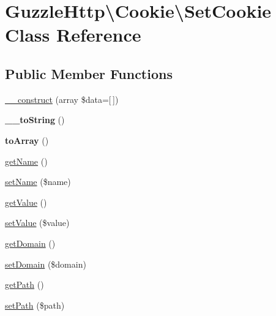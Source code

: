 \hypertarget{classGuzzleHttp_1_1Cookie_1_1SetCookie}{}\section{Guzzle\+Http\textbackslash{}Cookie\textbackslash{}Set\+Cookie Class Reference}
\label{classGuzzleHttp_1_1Cookie_1_1SetCookie}
\subsection*{Public Member Functions}
\begin{DoxyCompactItemize}
\item 
\hyperlink{classGuzzleHttp_1_1Cookie_1_1SetCookie_a743d69456fd1f19cb52e38d0b8dbfb75}{\+\_\+\+\_\+construct} (array \$data=\mbox{[}$\,$\mbox{]})
\item 
\mbox{\label{classGuzzleHttp_1_1Cookie_1_1SetCookie_a0b30c05bb7043c170f1d2a229b007053}} 
{\bfseries \+\_\+\+\_\+to\+String} ()
\item 
\mbox{\label{classGuzzleHttp_1_1Cookie_1_1SetCookie_ad47fa84e115b623fdba473dc4704dcd8}} 
{\bfseries to\+Array} ()
\item 
\hyperlink{classGuzzleHttp_1_1Cookie_1_1SetCookie_a573b2821257add2459ac921f74d05931}{get\+Name} ()
\item 
\hyperlink{classGuzzleHttp_1_1Cookie_1_1SetCookie_a8921080d5e7ec99f8a6aaad461543f47}{set\+Name} (\$name)
\item 
\hyperlink{classGuzzleHttp_1_1Cookie_1_1SetCookie_aabb8fb580eb7bf635830e850986ae47d}{get\+Value} ()
\item 
\hyperlink{classGuzzleHttp_1_1Cookie_1_1SetCookie_a9ffacb8b0c83065f3f1ecd86ab975b7e}{set\+Value} (\$value)
\item 
\hyperlink{classGuzzleHttp_1_1Cookie_1_1SetCookie_a00d077c7eb6f6c5f62f28b3065250280}{get\+Domain} ()
\item 
\hyperlink{classGuzzleHttp_1_1Cookie_1_1SetCookie_aa9edd4846d58d175f62b5f4edf586452}{set\+Domain} (\$domain)
\item 
\hyperlink{classGuzzleHttp_1_1Cookie_1_1SetCookie_abc668af0d59edafcf6e050c225581437}{get\+Path} ()
\item 
\hyperlink{classGuzzleHttp_1_1Cookie_1_1SetCookie_a7a0f5c66d21776b51fbb78276ec99923}{set\+Path} (\$path)

\end{DoxyCompactItemize}
